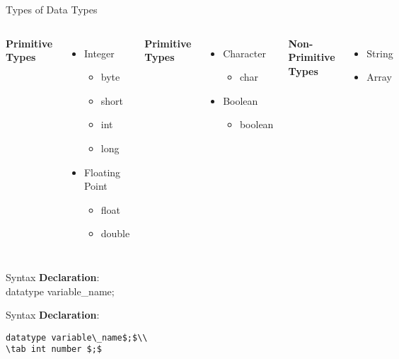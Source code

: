 \documentclass[aspectratio=169,14pt,usenames,dvipsnames]{beamer}
\newcommand\tab[1][1cm]{\hspace*{#1}}
\begin{document}
\begin{frame}{Types of Data Types}
\begin{columns}
\textbf{Primitive Types}
\begin{itemize}
\item Integer
\begin{itemize}
\item byte
\item short
\item int
\item long
\end{itemize}

\item Floating Point
\begin{itemize}
\item float
\item double
\end{itemize}
\end{itemize}

\textbf{Primitive Types}
\begin{itemize}
\item Character
\begin{itemize}
\item char
\end{itemize}
\item Boolean
\begin{itemize}
\item boolean
\end{itemize}
\end{itemize}

\textbf{Non-Primitive Types}
\begin{itemize}
\item String
\item Array
\end{itemize}
\end{columns}
\end{frame}


\begin{frame}{Syntax}
\textbf{Declaration$:$}\\
datatype variable\_name$;$
\end{frame}

\begin{frame}{Syntax}
\textbf{Declaration$:$}\\

\begin{lstlisting}
datatype variable\_name$;$\\
\tab int number $;$
\end{lstlisting}
\end{frame}
\end{document}
